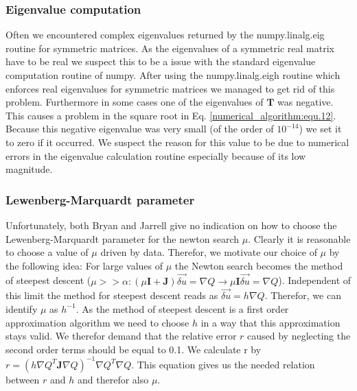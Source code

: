 \subsubsection*{Eigenvalue computation}
Often we encountered complex eigenvalues returned by the numpy.linalg.eig routine for symmetric matrices.
As the eigenvalues of a symmetric real matrix have to be real we suspect this to be a issue with the standard eigenvalue computation routine of numpy.
After using the numpy.linalg.eigh routine which enforces real eigenvalues for symmetric matrices we managed to get rid of this problem.
Furthermore in some cases one of the eigenvalues of $\mathbf{T}$ was negative. This causes a problem in the square root in Eq. \ref{numerical_algorithm:equ.12}. Because this negative eigenvalue was very small (of the order of $10^{-14}$) we set it to zero if it occurred. We suspect the reason for this value to be due to numerical errors in the eigenvalue calculation routine especially because of its low magnitude.
\subsubsection*{Lewenberg-Marquardt parameter}
Unfortunately, both Bryan and Jarrell give no indication on how to choose the Lewenberg-Marquardt parameter for the newton search $\mu$.
Clearly it is reasonable to choose a value of $\mu$ driven by data.
Therefor, we motivate our choice of $\mu$ by the following idea:\newline
For large values of $\mu$ the Newton search becomes the method of steepest descent ($\mu >> \alpha: (\mu \mathbf{I} + \mathbf{J})\vec{\delta u} = \nabla Q \rightarrow \mu \mathbf{I} \vec{\delta u} = \nabla Q$). Independent of this limit the method for steepest descent reads as $\vec{\delta u} = h \nabla Q$. Therefor, we can identify $\mu$ as $h^{-1}$.\newline
As the method of steepest descent is a first order approximation algorithm we need to choose $h$ in a way that this approximation stays valid. We therefor demand that the relative error $r$ caused by neglecting the second order terms should be equal to 0.1. We calculate r by $r = (h\nabla Q^T \mathbf{J}\nabla Q)^{-1}\nabla Q^T\nabla Q$. This equation gives us the needed relation between $r$ and $h$ and therefor also $\mu$.

